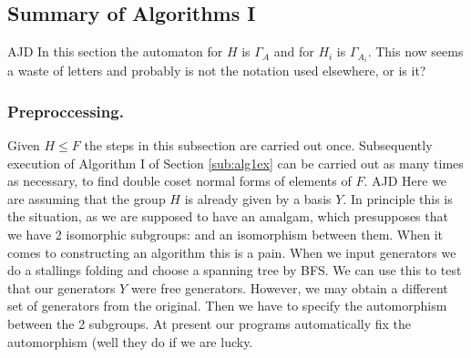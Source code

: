 \documentclass[a4paper,12pt]{article}
\newcommand{\G}{\Gamma }
\numberwithin{equation}{section}
\numberwithin{figure}{section}
\newenvironment{ajd1}{\noindent\color{red} AJD }{}
\newcommand{\ajd}[1]{\begin{ajd1} #1 \end{ajd1}}
\begin{document}
\subsection{Summary of Algorithms I}\label{sub:sum_algI}
\ajd{In this section the automaton for $H$ is $\G_A$ and for 
$H_i$ is $\G_{A_i}$. This now seems a waste of letters and probably
is not the notation used elsewhere, or is it?}
\subsubsection{Preproccessing.}\label{sub:algIpre}
Given $H\le F$
 the
steps in this subsection are carried out once. Subsequently  execution of Algorithm I of Section \ref{sub:alg1ex} can be carried out as many times as necessary,
to find double coset normal forms of elements of $F$.
\ajd{Here we are assuming that the group $H$ is already given by
 a basis $Y$. In principle this is the situation, as we are
supposed to have an amalgam, which presupposes that we have
2 isomorphic subgroups: and an isomorphism between them. When it comes
to constructing an algorithm this is a pain. When we input generators
we do a stallings folding and choose a spanning tree by BFS. We can
use this to test that our generators $Y$ were free generators. However,
we may obtain a different set of generators from the original. Then we
have to specify the automorphism between the 2 subgroups. At present
our programs automatically fix the automorphism (well they do if we
are lucky.}
\end{document}
